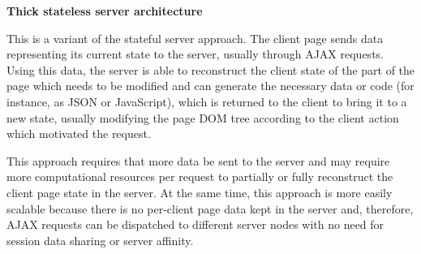\textbf{Thick stateless server architecture}

This is a variant of the stateful server approach. The client page sends data representing its current state to the server, usually through AJAX requests. Using this data, the server is able to reconstruct the client state of the part of the page which needs to be modified and can generate the necessary data or code (for instance, as JSON or JavaScript), which is returned to the client to bring it to a new state, usually modifying the page DOM tree according to the client action which motivated the request.

This approach requires that more data be sent to the server and may require more computational resources per request to partially or fully reconstruct the client page state in the server. At the same time, this approach is more easily scalable because there is no per-client page data kept in the server and, therefore, AJAX requests can be dispatched to different server nodes with no need for session data sharing or server affinity. \cite{arc_over}